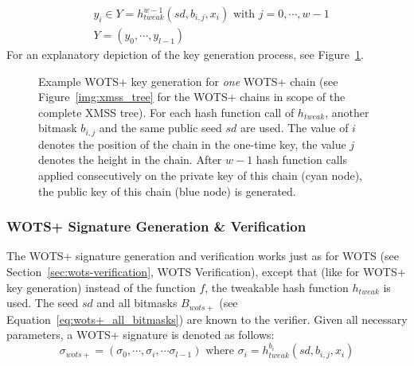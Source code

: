 \begin{align}
\label{eq:wots+_pubkeygen}
&y_i \in Y = h_{tweak}^{w-1}(sd,b_{i,j}, x_i) \text{ with } j= 0,\cdots,w-1 \\
&Y = (y_0, \cdots, y_{l-1})
\end{align}
For an explanatory depiction of the key generation process, see Figure~\ref{img:wots+_bitmask_hashcall}.


\begin{figure}
\centering
{}
\caption{Example WOTS+ key generation for \textit{one} WOTS+ chain (see Figure~\ref{img:xmss_tree} for the WOTS+ chains in scope of the complete XMSS tree). For each hash function call of $h_{tweak}$, another bitmask $b_{i,j}$ and the same public seed $sd$ are used. The value of $i$ denotes the position of the chain in the one-time key, the value $j$ denotes the height in the chain.
After $w-1$ hash function calls applied consecutively on the private key of this chain (\textcolor{cyan_tud}{cyan node}), the public key of this chain (\textcolor{darkblue_tud}{blue node}) is generated.  }
\label{img:wots+_bitmask_hashcall}
\end{figure}


\subsubsection{WOTS+ Signature Generation \& Verification}
The WOTS+ signature generation and verification works just as for WOTS (see Section~\ref{sec:wots-verification}, WOTS Verification), except that (like for WOTS+ key generation) instead of the function $f$, the tweakable hash function $h_{tweak}$ is used. The seed $sd$ and all bitmasks $B_{wots+}$ (see Equation~\ref{eq:wots+_all_bitmasks}) are known to the verifier. 
Given all necessary parameters, a WOTS+ signature is denoted as follows:
\begin{equation}
\label{eq:wots+_sig_gen}
\sigma_{wots+} = (\sigma_0, \cdots, \sigma_i, \cdots \sigma_{l-1}) \text{ where } \sigma_i = h_{tweak}^{b_i}(sd,b_{i,j},x_i)
\end{equation}

